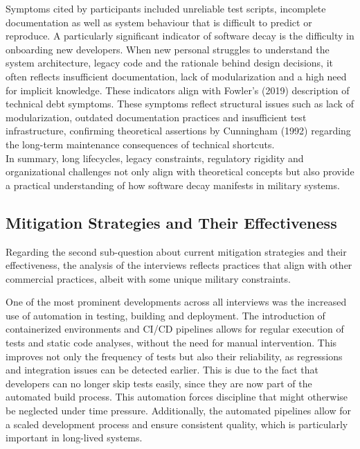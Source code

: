 Symptoms cited by participants included unreliable test scripts, incomplete documentation as well as system behaviour that is difficult to predict or reproduce. A particularly significant indicator of software decay is the difficulty in onboarding new developers. When new personal struggles to understand
the system architecture, legacy code and the rationale behind design decisions, it often reflects insufficient documentation, lack of modularization and a high need for implicit knowledge. These indicators align with Fowler's (2019) description of technical debt symptoms.
These symptoms reflect structural issues such as lack of modularization, outdated documentation practices and insufficient test infrastructure, confirming theoretical assertions by Cunningham (1992) regarding the long-term maintenance consequences of technical shortcuts.\\

In summary, long lifecycles, legacy constraints, regulatory rigidity and organizational challenges not only align with theoretical concepts but also provide a practical understanding of how software decay manifests in military systems.

\subsection{Mitigation Strategies and Their Effectiveness}
Regarding the second sub-question about current mitigation strategies and their effectiveness, the analysis of the interviews reflects practices that align with other commercial practices, albeit with some unique military constraints.

One of the most prominent developments across all interviews was the increased use of automation in testing, building and deployment. The introduction of containerized environments and CI/CD pipelines allows for regular execution of tests and static code analyses, without the need for manual intervention.
This improves not only the frequency of tests but also their reliability, as regressions and integration issues can be detected earlier. This is due to the fact that developers can no longer skip tests easily, since they are now part of the automated build process.
This automation forces discipline that might otherwise be neglected under time pressure. Additionally, the automated pipelines allow for a scaled development process and ensure consistent quality, which is particularly important in long-lived systems.\\

